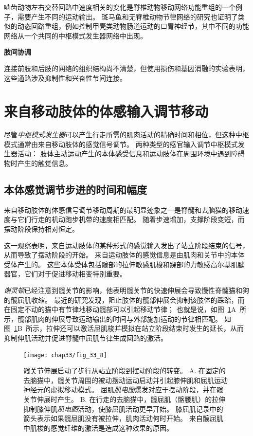 啮齿动物左右交替回路中速度相关的变化是脊椎动物移动网络功能重组的一个例子，需要产生不同的运动输出。
斑马鱼和无脊椎动物节律网络的研究也证明了类似的动态回路重组，例如控制甲壳类动物肠道运动的口胃神经节，其中不同的功能网络从一个共同的中枢模式发生器网络中出现。


\textbf{肢间协调}

连接前肢和后肢的网络的组织结构尚不清楚，但使用损伤和基因消融的实验表明，这些通路涉及抑制性和兴奋性节间连接。



\section{来自移动肢体的体感输入调节移动}

尽管\textit{中枢模式发生器}可以产生行走所需的肌肉活动的精确时间和相位，但这种中枢模式通常由来自移动肢体的感觉信号调节。
两种类型的感官输入调节中枢模式发生器活动：
肢体主动运动产生的本体感受信息和运动肢体在周围环境中遇到障碍物时产生的触觉信息。



\subsection{本体感觉调节步进的时间和幅度}

来自移动肢体的体感信号调节移动周期的最明显迹象之一是脊髓和去脑猫的移动速度与它们行走的机动跑步机带的速度相匹配。
随着步速增加，支撑阶段变短，而摆动阶段保持相对恒定。


这一观察表明，来自运动肢体的某种形式的感觉输入发出了站立阶段结束的信号，从而导致了摆动阶段的开始。
来自运动肢体的感觉信息是由肌肉和关节中的本体受体产生的。
这些本体受体包括髋部的拉伸敏感肌梭和踝部的力敏感高尔基肌腱器官，它们对于促进移动相变特别重要。


\textit{谢灵顿}已经注意到髋关节的影响，他表明髋关节的快速伸展会导致慢性脊髓猫和狗的髋屈肌收缩。
最近的研究发现，阻止肢体的髋部伸展会抑制该肢体的踩踏，而在固定不动的猫中有节律地移动髋部可以引起移动节律；
也就是说，如图~\ref{fig:33_8}A~所示，髋部肌肉的伸展导致运动输出的时间与外部施加运动的节律相匹配。
如图~\ref{fig:33_8}B~所示，拉伸还可以激活屈肌梭并模拟在站立阶段结束时发生的延长，从而抑制伸肌活动并促进脊髓中屈肌节律生成回路的激活。


\begin{figure}[htbp]
	\centering
	\texttt{[image: chap33/fig\_33\_8]}
	\caption{髋关节伸展启动了步行从站立阶段到摆动阶段的转变。
	A. 在固定的去脑猫中，髋关节周围的被动摆动运动启动并引起膝伸肌和屈肌运动神经元的虚拟移动模式。
	屈肌\textit{肌电图}爆发对应于摆动阶段，并在髋关节伸展时产生\cite{kriellaars1994mechanical}。
	B. 在行走的去脑猫中，髋屈肌（髂腰肌）的拉伸抑制膝伸肌\textit{肌电图}活动，使膝屈肌活动更早开始。
	膝屈肌记录中的箭头表示如果髋屈肌没有被拉伸，肌肉活动何时开始。
	来自髋屈肌中肌梭的感觉纤维的激活是造成这种效果的原因\cite{hiebert1996contribution}。}
	\label{fig:33_8}
\end{figure}


